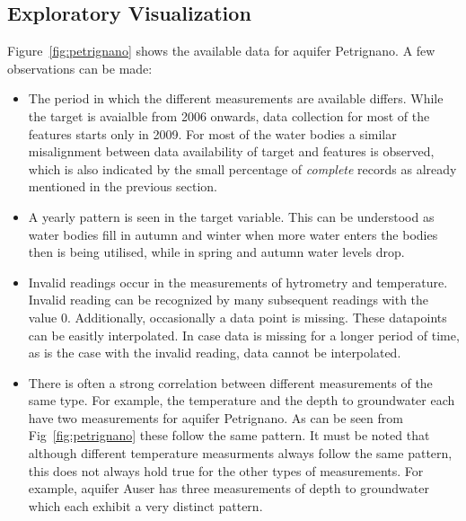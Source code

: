 \documentclass{article}
\begin{document}
\subsection*{Exploratory Visualization}

Figure~\ref{fig:petrignano} shows the available data for aquifer Petrignano. A few observations can be made:

\begin{itemize}
\item The period in which the different measurements are available differs. While the target is avaialble from 2006 onwards, data collection for most of the features starts only in 2009. For most of the water bodies a similar misalignment between data availability of target and features is observed, which is also indicated by the small percentage of \emph{complete} records as already mentioned in the previous section.
\item A yearly pattern is seen in the target variable. This can be understood as water bodies fill in autumn and winter when more water enters the bodies then is being utilised, while in spring and autumn water levels drop. 
\item Invalid readings occur in the measurements of hytrometry and temperature. Invalid reading can be recognized by many subsequent readings with the value $0$. Additionally, occasionally a data point is missing. These datapoints can be easitly interpolated. In case data is missing for a longer period of time, as is the case with the invalid reading, data cannot be interpolated.
\item There is often a strong correlation between different measurements of the same type. For example, the temperature and the depth to groundwater each have two measurements for aquifer Petrignano. As can be seen from Fig~\ref{fig:petrignano} these follow the same pattern. It must be noted that although different temperature measurments always follow the same pattern, this does not always hold true for the other types of measurements. For example, aquifer Auser has three measurements of depth to groundwater which each exhibit a very distinct pattern.  
\end{itemize}
\end{document}
